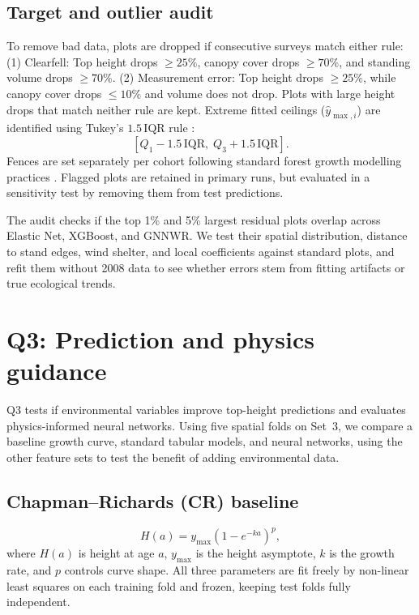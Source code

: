 \subsection*{Target and outlier audit}
To remove bad data, plots are dropped if consecutive surveys match either rule:(1) Clearfell: Top height drops $\ge 25\%$, canopy cover drops $\ge 70\%$, and standing volume drops $\ge 70\%$.
(2) Measurement error: Top height drops $\ge 25\%$, while canopy cover drops $\le 10\%$ and volume does not drop. Plots with large height drops that match neither rule are kept. Extreme fitted ceilings ($\hat{y}_{\max,i}$) are identified using Tukey's $1.5\,\mathrm{IQR}$ rule \cite{tukey1977exploratory}: %
\begin{equation}
\left[Q_1 - 1.5\,\mathrm{IQR},\; Q_3 + 1.5\,\mathrm{IQR}\right].
\label{eq:tukey-fences}
\end{equation}
Fences are set separately per cohort following standard forest growth modelling practices \cite{weiskittel2011forest}. %
Flagged plots are retained in primary runs, but evaluated in a sensitivity test by removing them from test predictions.

The audit checks if the top 1\% and 5\% largest residual plots overlap across Elastic Net, XGBoost, and GNNWR. We test their spatial distribution, distance to stand edges, wind shelter, and local coefficients against standard plots, and refit them without 2008 data to see whether errors stem from fitting artifacts or true ecological trends.

\section{Q3: Prediction and physics guidance}

Q3 tests if environmental variables improve top-height predictions and evaluates physics-informed neural networks. Using five spatial folds on Set~3, we compare a baseline growth curve, standard tabular models, and neural networks, using the other feature sets to test the benefit of adding environmental data.

\subsection{Chapman--Richards (CR) baseline}
\begin{equation}
H(a) = y_{\max}\left(1 - e^{-ka}\right)^p,
\label{eq:cr}
\end{equation}
where $H(a)$ is height at age $a$, $y_{\max}$ is the height asymptote, $k$ is the growth rate, and $p$ controls curve shape. All three parameters are fit freely by non-linear least squares on each training fold and frozen, keeping test folds fully independent.

